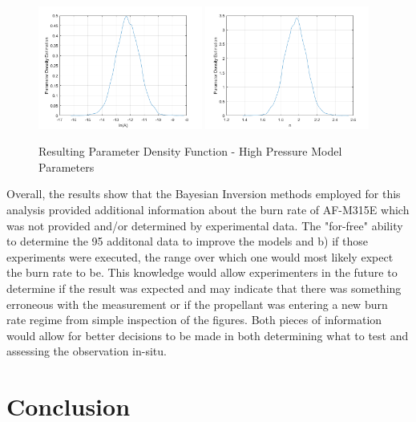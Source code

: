 \documentclass{article}
\begin{document}
\begin{figure}[htb]
\centering
\includegraphics[width=0.48\textwidth]{PDF_lnA_HP.png}
\includegraphics[width=0.48\textwidth]{PDF_n_HP.png}
\caption{Resulting Parameter Density Function - High Pressure Model Parameters}
\label{HPpdf}
\end{figure}

Overall, the results show that the Bayesian Inversion methods employed for this analysis provided additional information
about the burn rate of AF-M315E which was not provided and/or determined by experimental data. The "for-free" ability to
determine the 95%
additonal data to improve the models and b) if those experiments were executed, the range over which one would most likely
expect the burn rate to be. This knowledge would allow experimenters in the future to determine if the result was expected
and may indicate that there was something erroneous with the measurement or if the propellant was entering a new burn rate
regime from simple inspection of the figures. Both pieces of information would allow for better decisions to be made in
both determining what to test and assessing the observation in-situ.

\section{Conclusion} \label{conclusion}
\end{document}

